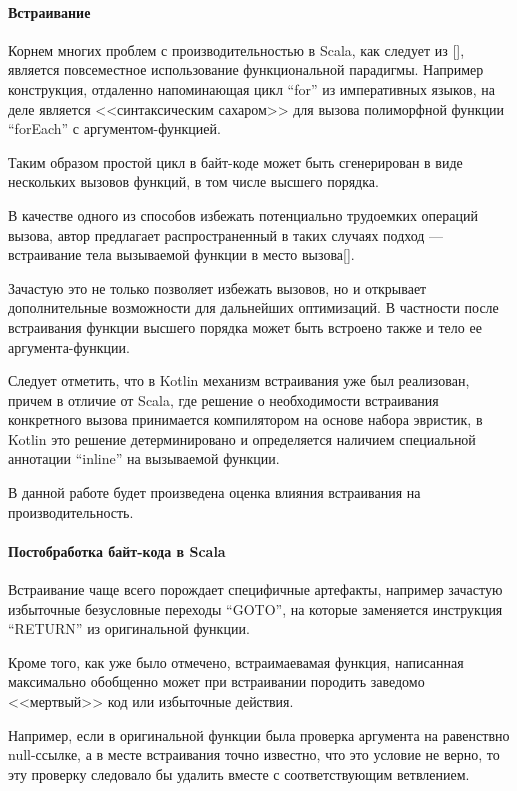 \paragraph{Встраивание}
Корнем многих проблем с производительностью в Scala, как следует из [], является повсеместное
использование функциональной парадигмы.
Например конструкция, отдаленно напоминающая цикл ``for'' из императивных языков, на деле является
<<синтаксическим сахаром>> для вызова полиморфной функции ``forEach'' с аргументом-функцией.

Таким образом простой цикл в байт-коде может быть сгенерирован в виде нескольких вызовов функций,
в том числе высшего порядка.


В качестве одного из способов избежать потенциально трудоемких операций вызова, автор предлагает
распространенный в таких случаях подход --- встраивание тела вызываемой функции в место вызова[].

Зачастую это не только позволяет избежать вызовов, но и открывает дополнительные возможности для
дальнейших оптимизаций.
В частности после встраивания функции высшего порядка может быть встроено также и тело ее
аргумента-функции.

Следует отметить, что в Kotlin механизм встраивания уже был реализован, причем в отличие от Scala,
где решение о необходимости встраивания конкретного вызова принимается компилятором на основе
набора эвристик, в Kotlin это решение детерминировано и определяется наличием специальной
аннотации ``inline'' на вызываемой функции.

В данной работе будет произведена оценка влияния встраивания на производительность.

\paragraph{Постобработка байт-кода в Scala}
Встраивание чаще всего порождает специфичные артефакты, например зачастую избыточные безусловные
переходы ``GOTO'', на которые заменяется инструкция ``RETURN'' из оригинальной функции.

Кроме того, как уже было отмечено, встраимаевамая функция, написанная максимально обобщенно может
при встраивании породить заведомо <<мертвый>> код или избыточные действия.

Например, если в оригинальной функции была проверка аргумента на равенствно null-ссылке, а в месте
встраивания точно известно, что это условие не верно, то эту проверку следовало бы удалить вместе
с соответствующим ветвлением.

